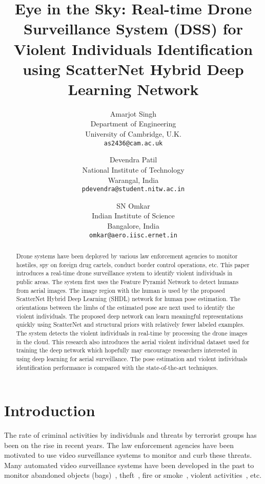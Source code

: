 \documentclass[10pt,twocolumn,letterpaper]{article}
\title{Eye in the Sky: Real-time Drone Surveillance System (DSS) for Violent Individuals Identification using ScatterNet Hybrid Deep Learning Network}
\begin{document}
\author{Amarjot Singh\\
Department of Engineering\\
University of Cambridge, U.K.\\
{\tt\small as2436@cam.ac.uk} \\
\and
Devendra Patil\\
National Institute of Technology\\
Warangal, India\\
{\tt\small pdevendra@student.nitw.ac.in} \\
\and
SN Omkar\\
Indian Institute of Science\\
Bangalore, India\\
{\tt\small omkar@aero.iisc.ernet.in} \\
}

\maketitle

\begin{abstract}
Drone systems have been deployed by various law enforcement agencies to monitor hostiles, spy on foreign drug cartels, conduct border control operations, etc. This paper introduces a real-time drone surveillance system to identify violent individuals in public areas. The system first uses the Feature Pyramid Network to detect humans from aerial images. The image region with the human is used by the proposed ScatterNet Hybrid Deep Learning (SHDL) network for human pose estimation. The orientations between the limbs of the estimated pose are next used to identify the violent individuals. The proposed deep network can learn meaningful representations quickly using ScatterNet and structural priors with relatively fewer labeled examples. The system detects the violent individuals in real-time by processing the drone images in the cloud. This research also introduces the aerial violent individual dataset used for training the deep network which hopefully may encourage researchers interested in using deep learning for aerial surveillance. The pose estimation and violent individuals identification performance is compared with the state-of-the-art techniques.
\end{abstract}

\section{Introduction}
The rate of criminal activities by individuals and threats by terrorist groups has been on the rise in recent years. The law enforcement agencies have been motivated to use video surveillance systems to monitor and curb these threats. Many automated video surveillance systems have been developed in the past to monitor abandoned objects (bags)~\cite{li2010abandoned}, theft~\cite{chuang2009carried}, fire or smoke~\cite{seebamrungsat2014fire}, violent activities~\cite{goya2009method}, etc.
\end{document}
